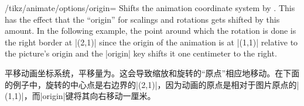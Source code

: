 \begin{key}{/tikz/animate/options/origin=}
    Shifts the animation coordinate system by . This has the
    effect that the ``origin'' for scalings and rotations gets shifted by this
    amount. In the following example, the point around which the rotation is
    done is the right border at |(2,1)| since the origin of the animation is at
    |(1,1)| relative to the picture's origin and the |origin| key shifts it one
    centimeter to the right.
    
    平移动画坐标系统，平移量为。这会导致缩放和旋转的“原点”相应地移动。在下面的例子中，旋转的中心点是右边界的|(2,1)|，因为动画的原点是相对于图片原点的|(1,1)|，而|origin|键将其向右移动一厘米。


\begin{codeexample}[
    preamble={\usetikzlibrary{animations}},
    animation list={0.5,1,1.5,2},
]
\end{codeexample}
\end{key}

